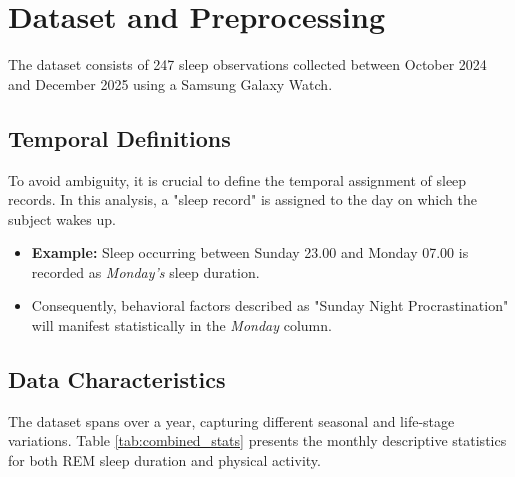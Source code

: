 \documentclass[conference]{IEEEtran}
\begin{document}
\section{Dataset and Preprocessing}
The dataset consists of 247 sleep observations collected between October 2024 and December 2025 using a Samsung Galaxy Watch.

\subsection{Temporal Definitions}
To avoid ambiguity, it is crucial to define the temporal assignment of sleep records. In this analysis, a "sleep record" is assigned to the day on which the subject wakes up.
\begin{itemize}
    \item \textbf{Example:} Sleep occurring between Sunday 23.00 and Monday 07.00 is recorded as \textit{Monday's} sleep duration.
    \item Consequently, behavioral factors described as "Sunday Night Procrastination" will manifest statistically in the \textit{Monday} column.
\end{itemize}

\subsection{Data Characteristics}
The dataset spans over a year, capturing different seasonal and life-stage variations. Table \ref{tab:combined_stats} presents the monthly descriptive statistics for both REM sleep duration and physical activity.
\end{document}
